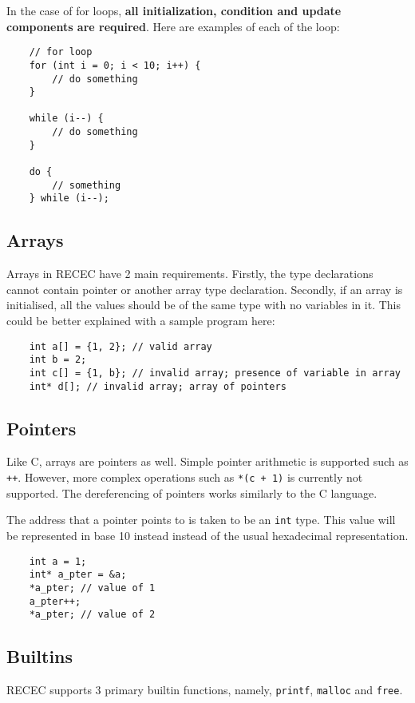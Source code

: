 \documentclass[a4paper]{article}
\begin{document}
In the case of for loops, \textbf{all initialization, condition and update components are required}. Here are examples of each of the loop:

\begin{verbatim}
	// for loop
	for (int i = 0; i < 10; i++) {
		// do something
	}

	while (i--) {
		// do something
	}

	do {
		// something
	} while (i--);
\end{verbatim}

\subsection{Arrays}
Arrays in RECEC have 2 main requirements. Firstly, the type declarations cannot contain pointer or another array type declaration. Secondly, if an array is initialised, all the values should be of the same type with no variables in it. This could be better explained with a sample program here:

\begin{verbatim}
	int a[] = {1, 2}; // valid array
	int b = 2;
	int c[] = {1, b}; // invalid array; presence of variable in array
	int* d[]; // invalid array; array of pointers
\end{verbatim}

\subsection{Pointers}

Like C, arrays are pointers as well. Simple pointer arithmetic is supported such as \texttt{++}. However, more complex operations such as \texttt{*(c + 1)} is currently not supported. The dereferencing of pointers works similarly to the C language. 

The address that a pointer points to is taken to be an \texttt{int} type. This value will be represented in base 10 instead instead of the usual hexadecimal representation. 

\begin{verbatim}
	int a = 1;
	int* a_pter = &a;
	*a_pter; // value of 1
	a_pter++;
	*a_pter; // value of 2
\end{verbatim}

\subsection{Builtins}

RECEC supports 3 primary builtin functions, namely, \texttt{printf}, \texttt{malloc} and \texttt{free}.
\end{document}

